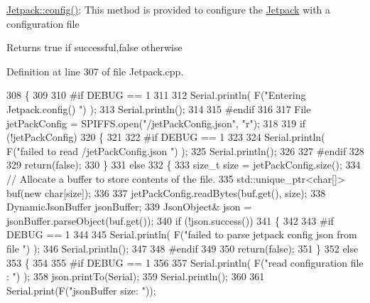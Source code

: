 \hyperlink{class_jetpack_ab065ee83e244265a2223a22f3ee4a719}{Jetpack\+::config()}\+: This method is provided to configure the \hyperlink{class_jetpack}{Jetpack} with a configuration file

\begin{DoxyReturn}{Returns}
true if successful,false otherwise 
\end{DoxyReturn}


Definition at line 307 of file Jetpack.\+cpp.


\begin{DoxyCode}
308 \{
309 
310 \textcolor{preprocessor}{#if DEBUG == 1 }
311 
312     Serial.println( F(\textcolor{stringliteral}{"Entering Jetpack.config() "}) );
313     Serial.println();
314 
315 \textcolor{preprocessor}{#endif}
316 
317     File jetPackConfig = SPIFFS.open(\textcolor{stringliteral}{"/jetPackConfig.json"}, \textcolor{stringliteral}{"r"});
318 
319     \textcolor{keywordflow}{if} (!jetPackConfig) 
320     \{
321 
322 \textcolor{preprocessor}{    #if DEBUG == 1 }
323 
324         Serial.println( F(\textcolor{stringliteral}{"failed to read /jetPackConfig.json "}) );
325         Serial.println();
326 
327 \textcolor{preprocessor}{    #endif}
328 
329         \textcolor{keywordflow}{return}(\textcolor{keyword}{false});
330     \}
331     \textcolor{keywordflow}{else}
332     \{
333         \textcolor{keywordtype}{size\_t} size = jetPackConfig.size();
334         \textcolor{comment}{// Allocate a buffer to store contents of the file.}
335         std::unique\_ptr<char[]> buf(\textcolor{keyword}{new} \textcolor{keywordtype}{char}[size]);
336 
337         jetPackConfig.readBytes(buf.get(), size);
338         DynamicJsonBuffer jsonBuffer;
339         JsonObject& json = jsonBuffer.parseObject(buf.get());
340         \textcolor{keywordflow}{if} (!json.success()) 
341         \{
342         
343 \textcolor{preprocessor}{        #if DEBUG == 1 }
344 
345             Serial.println( F(\textcolor{stringliteral}{"failed to parse jetpack config json from file "}) );
346             Serial.println();
347 
348 \textcolor{preprocessor}{        #endif}
349 
350             \textcolor{keywordflow}{return}(\textcolor{keyword}{false});
351         \} 
352         \textcolor{keywordflow}{else}
353         \{ 
354         
355 \textcolor{preprocessor}{        #if DEBUG == 1 }
356 
357             Serial.println( F(\textcolor{stringliteral}{"read configuration file : "}) );
358             json.printTo(Serial);
359             Serial.println();
360 
361             Serial.print(F(\textcolor{stringliteral}{"jsonBuffer size: "}));

\end{DoxyCode}
